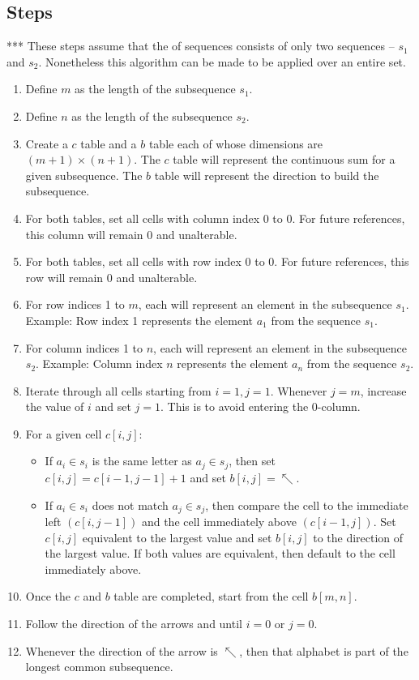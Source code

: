 \subsection*{Steps}
*** These steps assume that the of sequences consists of only two sequences -- $s_1$ and $s_2$. Nonetheless this algorithm can be made to be applied over an entire set.
\begin{enumerate}
	\item Define $m$ as the length of the subsequence $s_1$.
	\item Define $n$ as the length of the subsequence $s_2$.
	\item Create a $c$ table and a $b$ table each of whose dimensions are $(m + 1) \times (n + 1)$. The $c$ table will represent the continuous sum for a given subsequence. The $b$ table will represent the direction to build the subsequence.
	\item For both tables, set all cells with column index 0 to 0. For future references, this column will remain 0 and unalterable.
	\item For both tables, set all cells with row index 0 to 0. For future references, this row will remain 0 and unalterable.
	\item For row indices 1 to $m$, each will represent an element in the subsequence $s_1$. Example: Row index 1 represents the element $a_1$ from the sequence $s_1$.
	\item For column indices 1 to $n$, each will represent an element in the subsequence $s_2$. Example: Column index $n$ represents the element $a_n$ from the sequence $s_2$.
	\item Iterate through all cells starting from $i = 1, j = 1$. Whenever $j = m$, increase the value of $i$ and set $j = 1$. This is to avoid entering the 0-column. 
	\item For a given cell $c[i,j]$:
	\begin{itemize}
		\item If $a_i \in s_i$ is the same letter as $a_j \in s_j$, then set $c[i,j] = c[i-1,j-1]+1$ and set $b[i,j] = \nwarrow$.
		\item If $a_i \in s_i$ does not match $a_j \in s_j$, then compare the cell to the immediate left $(c[i,j-1])$ and the cell immediately above $(c[i-1,j])$. Set $c[i,j]$ equivalent to the largest value and set $b[i,j]$ to the direction of the largest value. If both values are equivalent, then default to the cell immediately above.
	\end{itemize}
	\item Once the $c$ and $b$ table are completed, start from the cell $b[m,n]$.
	\item Follow the direction of the arrows and until $i = 0$ or $j = 0$.
	\item Whenever the direction of the arrow is $\nwarrow$, then that alphabet is part of the longest common subsequence.
\end{enumerate}


